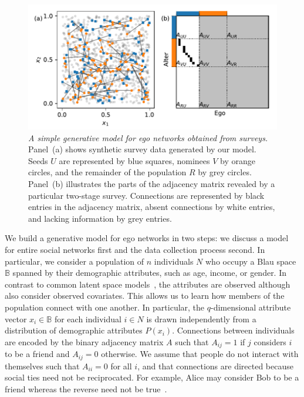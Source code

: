 \documentclass{scrartcl}
\newcommand{\population}{N}
\newcommand{\seeds}{U}
\newcommand{\nominees}{V}
\newcommand{\missing}{R}
\newcommand{\blauspace}{\mathbb{B}}
\newcommand{\titlecaption}[2]{\caption[#1]{\emph{#1} #2}}
\begin{document}
\begin{figure}
    \includegraphics{survey-synthetic}
    \titlecaption{A simple generative model for ego networks obtained from surveys.}{Panel~(a) shows synthetic survey data generated by our model. Seeds $\seeds$ are represented by blue squares, nominees $\nominees$ by orange circles, and the remainder of the population $\missing$ by grey circles. Panel~(b) illustrates the parts of the adjacency matrix revealed by a particular two-stage survey. Connections are represented by black entries in the adjacency matrix, absent connections by white entries, and lacking information by grey entries.\label{fig:survey-synthetic}}
\end{figure}

We build a generative model for ego networks in two steps: we discuss a model for entire social networks first and the data collection process second. In particular, we consider a population of $n$ individuals $\population$ who occupy a Blau space $\blauspace$ spanned by their demographic attributes, such as age, income, or gender. In contrast to common latent space models~\cite{Hoff2002, Hoff2008, Handcock2007}, the attributes are observed although \textcite{Hoff2002} also consider observed covariates. This allows us to learn how members of the population connect with one another. In particular, the $q$-dimensional attribute vector $x_i\in\blauspace$ for each individual $i\in \population$ is drawn independently from a distribution of demographic attributes $P(x_i)$. Connections between individuals are encoded by the binary adjacency matrix $A$ such that $A_{ij}=1$ if $j$ considers $i$ to be a friend and $A_{ij}=0$ otherwise. We assume that people do not interact with themselves such that $A_{ii}=0$ for all $i$, and that connections are directed because social ties need not be reciprocated. For example, Alice may consider Bob to be a friend whereas the reverse need not be true~\cite{Ball2013}.
\end{document}
